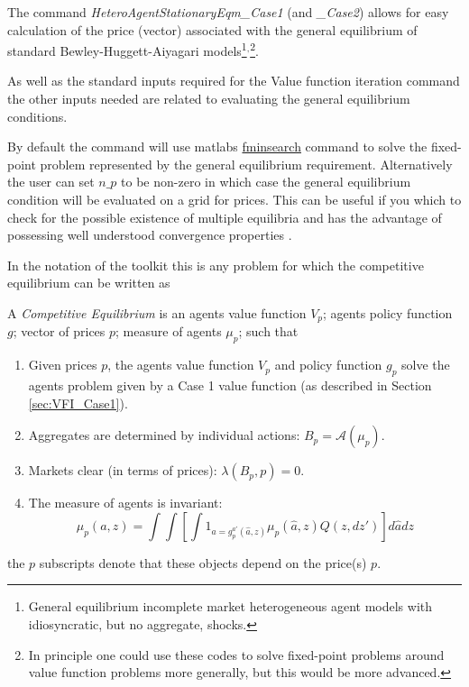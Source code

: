 The command \textit{HeteroAgentStationaryEqm\_{}Case1} (and \textit{\_{}Case2}) allows for easy calculation of the price (vector) associated with the general equilibrium of
standard Bewley-Huggett-Aiyagari models\footnote{General equilibrium incomplete market heterogeneous agent models with idiosyncratic, but no aggregate, shocks.}$^{,}$\footnote{In
principle one could use these codes to solve fixed-point problems around value function problems more generally, but this would be more advanced.}.

As well as the standard inputs required for the Value function iteration command the other inputs needed are related to evaluating the general equilibrium
conditions.

By default the command will use matlabs \href{http://www.mathworks.com/help/matlab/ref/fminsearch.html}{fminsearch} command to solve the fixed-point problem represented by the general equilibrium requirement.
Alternatively the user can set $n\_{}p$ to be non-zero in which case the general equilibrium condition will be evaluated on a grid for prices. This can
be useful if you which to check for the possible existence of multiple equilibria and has the advantage of possessing well understood convergence
properties \citep*{KirkbyHeteroErrors}.

In the notation of the toolkit this is any problem for which the competitive equilibrium can be written as
\begin{definition} \label{defn:HeteroAgentCE}
A \textit{Competitive Equilibrium} is an agents value function $V_{p}$; agents policy function $g$;
vector of prices $p$; measure of agents $\mu_{p}$;
such that
\begin{enumerate}
 \item Given prices $p$, the agents value function $V_p$ and policy function $g_p$ solve the agents problem
   given by a Case 1 value function (as described in Section \ref{sec:VFI_Case1}).
 \item Aggregates are determined by individual actions: $B_p=\mathcal{A}(\mu_p)$.
 \item Markets clear (in terms of prices): $\lambda(B_p,p)=0$.
 \item The measure of agents is invariant:
      \begin{equation}
          \mu_p(a,z)=\int \int \left[ \int 1_{a=g^{a'}_p(\hat{a},z)}\mu_p(\hat{a},z) Q(z,dz')\right] d\hat{a}dz
      \end{equation}
\end{enumerate}
\end{definition}
the $p$ subscripts denote that these objects depend on the price(s) $p$.

